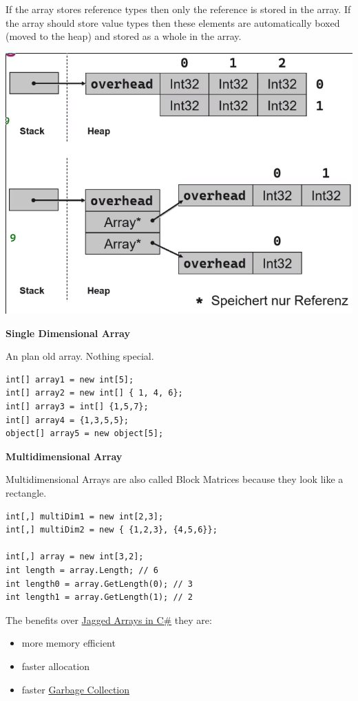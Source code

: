 \documentclass[11pt,twoside,landscape]{article}
\begin{document}
\begin{multicols}{3}
If the array stores reference types then only the reference is stored in the array. If the array should store value types then these elements are automatically boxed (moved to the heap) and stored as a whole in the array.

\begin{center}
\includegraphics[width=.9\linewidth]{img/array_memory_layout.png}
\label{org0bfe442}
\end{center}

\textbf{Single Dimensional Array}

An plan old array. Nothing special.
\lstset{language=csharp,label= ,caption= ,captionpos=b,numbers=none}
\begin{lstlisting}
int[] array1 = new int[5];
int[] array2 = new int[] { 1, 4, 6};
int[] array3 = int[] {1,5,7};
int[] array4 = {1,3,5,5};
object[] array5 = new object[5];
\end{lstlisting}

\textbf{Multidimensional Array}

Multidimensional Arrays are also called Block Matrices because they look like a rectangle.

\lstset{language=csharp,label= ,caption= ,captionpos=b,numbers=none}
\begin{lstlisting}
int[,] multiDim1 = new int[2,3];
int[,] multiDim2 = new { {1,2,3}, {4,5,6}};

int[,] array = new int[3,2];
int length = array.Length; // 6
int length0 = array.GetLength(0); // 3
int length1 = array.GetLength(1); // 2
\end{lstlisting}


The benefits over \href{../../../roam/20211008083300-jagged_arrays_in_c.org}{Jagged Arrays in C\#} they are:
\begin{itemize}
\item more memory efficient
\item faster allocation
\item faster \href{../../../roam/20211008083744-garbage_collection.org}{Garbage Collection}
\end{itemize}



\end{multicols}
\end{document}
